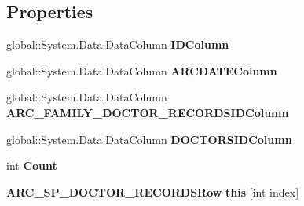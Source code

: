 \subsection*{Properties}
\begin{CompactItemize}
\item 
global::System.Data.DataColumn \textbf{IDColumn}\hspace{0.3cm}{\tt  [get]}\label{class_automatic_medical_system_1_1_data_set2_1_1_a_r_c___s_p___d_o_c_t_o_r___r_e_c_o_r_d_s_data_table_17ae0cc7c2867de5cd891fe9438c4fcf}

\item 
global::System.Data.DataColumn \textbf{ARCDATEColumn}\hspace{0.3cm}{\tt  [get]}\label{class_automatic_medical_system_1_1_data_set2_1_1_a_r_c___s_p___d_o_c_t_o_r___r_e_c_o_r_d_s_data_table_28ac427ec7c87ce38ce2d18663a663a0}

\item 
global::System.Data.DataColumn \textbf{ARC\_\-FAMILY\_\-DOCTOR\_\-RECORDSIDColumn}\hspace{0.3cm}{\tt  [get]}\label{class_automatic_medical_system_1_1_data_set2_1_1_a_r_c___s_p___d_o_c_t_o_r___r_e_c_o_r_d_s_data_table_2d401e0f8f38b565f3ffb0f266e393c1}

\item 
global::System.Data.DataColumn \textbf{DOCTORSIDColumn}\hspace{0.3cm}{\tt  [get]}\label{class_automatic_medical_system_1_1_data_set2_1_1_a_r_c___s_p___d_o_c_t_o_r___r_e_c_o_r_d_s_data_table_67736bbb1314c616eb966b1f9020a5bc}

\item 
int \textbf{Count}\hspace{0.3cm}{\tt  [get]}\label{class_automatic_medical_system_1_1_data_set2_1_1_a_r_c___s_p___d_o_c_t_o_r___r_e_c_o_r_d_s_data_table_2d69f71a8d18d0114ac1ba37f111b9cb}

\item 
{\bf ARC\_\-SP\_\-DOCTOR\_\-RECORDSRow} \textbf{this} [int index]\hspace{0.3cm}{\tt  [get]}\label{class_automatic_medical_system_1_1_data_set2_1_1_a_r_c___s_p___d_o_c_t_o_r___r_e_c_o_r_d_s_data_table_b9f7d353f9b09ba3e05e1c6f51d2d68e}

\end{CompactItemize}
